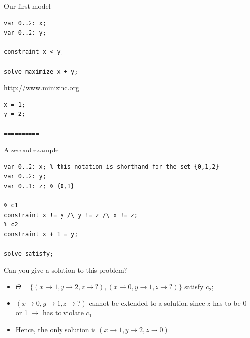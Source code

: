 \begin{frame}[fragile]{Our first model}
\begin{lstlisting}
var 0..2: x;
var 0..2: y; 

constraint x < y;

solve maximize x + y;
\end{lstlisting}

\vspace*{2ex}

\url{http://www.minizinc.org}

\vspace*{2ex}

\small
\begin{verbatim}
x = 1;
y = 2;
----------
==========
\end{verbatim}

\end{frame}

\begin{frame}[fragile]{A second example}
\begin{lstlisting}
var 0..2: x; % this notation is shorthand for the set {0,1,2}
var 0..2: y;
var 0..1: z; % {0,1}

% c1
constraint x != y /\ y != z /\ x != z;
% c2
constraint x + 1 = y;

solve satisfy;
\end{lstlisting}
  \vspace*{3ex}
    \alert{Can you give a solution to this problem?} \pause 

\begin{itemize}
\item $\Theta = \{ (x \to 1, y \to 2, z \to \textbf{?}), (x \to 0, y \to 1, z \to \textbf{?}) \}$ satisfy $c_2$; \pause
\item $(x \to 0, y \to 1, z \to ?)$ cannot be extended to a solution since $z$ has to be 0 or 1 $\rightarrow$ has to violate 
$c_1$ \pause
\item Hence, the only solution is $(x \to 1, y \to 2, z \to 0)$
\end{itemize}
\end{frame}

